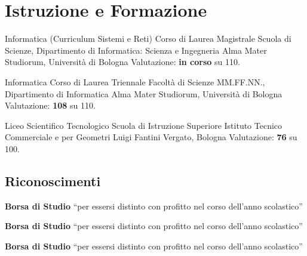 %
%
%
%
%
%



\section{Istruzione e Formazione}

{Informatica (Curriculum Sistemi e Reti)}
{Corso di Laurea Magistrale}
{Scuola di Scienze, Dipartimento di Informatica: Scienza e Ingegneria}
{Alma Mater Studiorum, Università di Bologna}
{Valutazione: \textbf{in corso} su 110.}

{Informatica}
{Corso di Laurea Triennale}
{Facoltà di Scienze MM.FF.NN., Dipartimento di Informatica}
{Alma Mater Studiorum, Università di Bologna}
{Valutazione: \textbf{108} su 110.}

{Liceo Scientifico Tecnologico}
{Scuola di Istruzione Superiore}
{Istituto Tecnico Commerciale e per Geometri Luigi Fantini}
{Vergato, Bologna}
{Valutazione: \textbf{76} su 100.}



\subsection{Riconoscimenti}

{\textbf{Borsa di Studio} ``per essersi distinto con profitto nel corso
dell'anno scolastico''}

{\textbf{Borsa di Studio} ``per essersi distinto con profitto nel corso
dell'anno scolastico''}

{\textbf{Borsa di Studio} ``per essersi distinto con profitto nel corso
dell'anno scolastico''}



